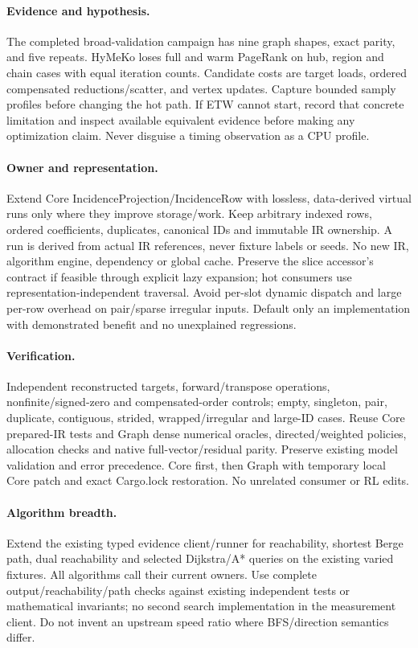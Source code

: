 \documentclass[11pt,a4paper]{article}
\begin{document}
\paragraph{Evidence and hypothesis.} The completed broad-validation campaign has
nine graph shapes, exact parity, and five repeats. HyMeKo loses full and warm
PageRank on hub, region and chain cases with equal iteration counts. Candidate
costs are target loads, ordered compensated reductions/scatter, and vertex updates.
Capture bounded samply profiles before changing the hot path. If ETW cannot start,
record that concrete limitation and inspect available equivalent evidence before
making any optimization claim. Never disguise a timing observation as a CPU profile.
\paragraph{Owner and representation.} Extend Core IncidenceProjection/IncidenceRow
with lossless, data-derived virtual runs only where they improve storage/work.
Keep arbitrary indexed rows, ordered coefficients, duplicates, canonical IDs and
immutable IR ownership. A run is derived from actual IR references, never fixture
labels or seeds. No new IR, algorithm engine, dependency or global cache.
Preserve the slice accessor's contract if feasible through explicit lazy expansion;
hot consumers use representation-independent traversal. Avoid per-slot dynamic
dispatch and large per-row overhead on pair/sparse irregular inputs. Default only
an implementation with demonstrated benefit and no unexplained regressions.
\paragraph{Verification.} Independent reconstructed targets, forward/transpose
operations, nonfinite/signed-zero and compensated-order controls; empty, singleton,
pair, duplicate, contiguous, strided, wrapped/irregular and large-ID cases. Reuse
Core prepared-IR tests and Graph dense numerical oracles, directed/weighted policies,
allocation checks and native full-vector/residual parity. Preserve existing model
validation and error precedence. Core first, then Graph with temporary local Core
patch and exact Cargo.lock restoration. No unrelated consumer or RL edits.
\paragraph{Algorithm breadth.} Extend the existing typed evidence client/runner
for reachability, shortest Berge path, dual reachability and selected Dijkstra/A*
queries on the existing varied fixtures. All algorithms call their current owners.
Use complete output/reachability/path checks against existing independent tests or
mathematical invariants; no second search implementation in the measurement client.
Do not invent an upstream speed ratio where BFS/direction semantics differ.
\end{document}
